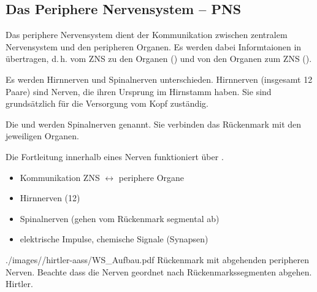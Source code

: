 % 
% 

\subsection{Das Periphere Nervensystem -- PNS}


{%
Das periphere Nervensystem dient der Kommunikation zwischen
zentralem Nervensystem und den peripheren Organen. Es werden
dabei Informtaionen in  übertragen,
d.\,h. vom ZNS zu den Organen () und von den Organen
zum ZNS ().

Es werden Hirnnerven und Spinalnerven unterschieden.
Hirnnerven (insgesamt 12 Paare) sind Nerven, die ihren
Ursprung im Hirnstamm haben. Sie sind grundsätzlich für die
Versorgung vom Kopf zuständig.

Die  und werden Spinalnerven genannt. Sie verbinden
das Rückenmark mit den jeweiligen Organen. 

Die Fortleitung innerhalb eines Nerven funktioniert über
. 
}
{
\begin{itemize}
    \item Kommunikation ZNS ${\longleftrightarrow}$
    periphere  Organe
    \item Hirnnerven (12)
    \item Spinalnerven (gehen vom Rückenmark segmental ab)
    \item elektrische Impulse, chemische Signale (Synapsen)
\end{itemize}
}
{./images//hirtler-aass/WS_Aufbau.pdf}
{\AuthNotesPicLegalOk{}{}Rückenmark
mit abgehenden peripheren Nerven. Beachte dass die Nerven
geordnet nach Rückenmarkssegmenten abgehen.}
{Hirtler.}



